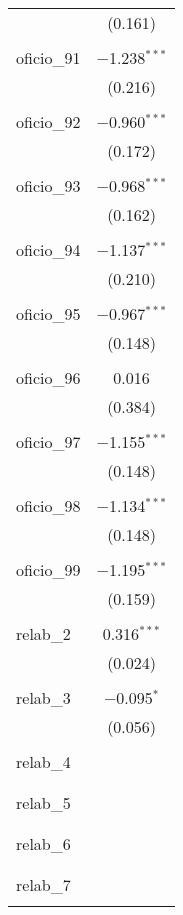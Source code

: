 \begin{table}[!htbp]
\begin{tabular}{@{\extracolsep{5pt}}lc}
  & (0.161) \\ 
  & \\ 
 oficio\_91 & $-$1.238$^{***}$ \\ 
  & (0.216) \\ 
  & \\ 
 oficio\_92 & $-$0.960$^{***}$ \\ 
  & (0.172) \\ 
  & \\ 
 oficio\_93 & $-$0.968$^{***}$ \\ 
  & (0.162) \\ 
  & \\ 
 oficio\_94 & $-$1.137$^{***}$ \\ 
  & (0.210) \\ 
  & \\ 
 oficio\_95 & $-$0.967$^{***}$ \\ 
  & (0.148) \\ 
  & \\ 
 oficio\_96 & 0.016 \\ 
  & (0.384) \\ 
  & \\ 
 oficio\_97 & $-$1.155$^{***}$ \\ 
  & (0.148) \\ 
  & \\ 
 oficio\_98 & $-$1.134$^{***}$ \\ 
  & (0.148) \\ 
  & \\ 
 oficio\_99 & $-$1.195$^{***}$ \\ 
  & (0.159) \\ 
  & \\ 
 relab\_2 & 0.316$^{***}$ \\ 
  & (0.024) \\ 
  & \\ 
 relab\_3 & $-$0.095$^{*}$ \\ 
  & (0.056) \\ 
  & \\ 
 relab\_4 &  \\ 
  &  \\ 
  & \\ 
 relab\_5 &  \\ 
  &  \\ 
  & \\ 
 relab\_6 &  \\ 
  &  \\ 
  & \\ 
 relab\_7 &  \\ 
  &  \\ 

\end{tabular}
\end{table}
